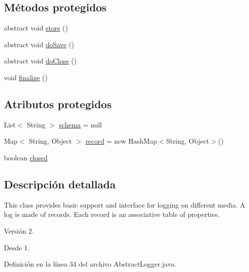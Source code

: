 \subsection*{Métodos protegidos}
\begin{DoxyCompactItemize}
\item 
abstract void \hyperlink{classjenes_1_1utils_1_1_abstract_logger_a6acf83a83999e26ae4ed45cbf355111b}{store} ()
\item 
abstract void \hyperlink{classjenes_1_1utils_1_1_abstract_logger_a41fcd50b050c467fe1b413fc5b49c167}{do\-Save} ()
\item 
abstract void \hyperlink{classjenes_1_1utils_1_1_abstract_logger_a5253672b3f3f81287db2fc604ca921a9}{do\-Close} ()
\item 
void \hyperlink{classjenes_1_1utils_1_1_abstract_logger_af2c45f653c6e5e79bc4e85dc3ecc4ab4}{finalize} ()
\end{DoxyCompactItemize}
\subsection*{Atributos protegidos}
\begin{DoxyCompactItemize}
\item 
List$<$ String $>$ \hyperlink{classjenes_1_1utils_1_1_abstract_logger_a3a2030876857a0512fae7e0ad400c570}{schema} = null
\item 
Map$<$ String, Object $>$ \hyperlink{classjenes_1_1utils_1_1_abstract_logger_ae85e356ad12255a9c5ec8f9f25659ef7}{record} = new Hash\-Map$<$String, Object$>$()
\item 
boolean \hyperlink{classjenes_1_1utils_1_1_abstract_logger_a68fe91d1c7bad9146db3bddd92bbcab3}{closed}
\end{DoxyCompactItemize}


\subsection{Descripción detallada}
This class provides basic support and interface for logging on different media. A log is made of records. Each record is an associative table of properties.

\begin{DoxyVersion}{Versión}
2. 
\end{DoxyVersion}
\begin{DoxySince}{Desde}
1. 
\end{DoxySince}


Definición en la línea 34 del archivo Abstract\-Logger.\-java.



